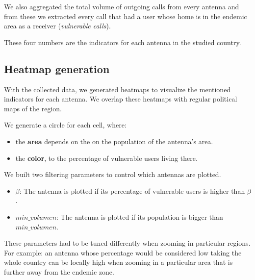     We also aggregated the total volume of outgoing calls from every antenna and from these we extracted every call that had a user whose home is in the endemic area as a receiver (\textit{vulnerable calls}).
    
    These four numbers are the indicators for each antenna in the studied country.

\subsection{Heatmap generation}
    With the collected data, we generated heatmaps to visualize the mentioned indicators for each antenna. We overlap these heatmaps with regular political maps of the region.
    
	We generate a circle for each cell, where:
	\begin{itemize}
		\item the \textbf{area} depends on the on the population of the antenna's area.
		\item the \textbf{color}, to the percentage of vulnerable users living there.
	\end{itemize}
    
    We built two filtering parameters to control which antennas are plotted.
    \begin{itemize}
        \item $\beta$: The antenna is plotted if its percentage of vulnerable users is higher than $\beta$.
        \item $min\_volumen$: The antenna is plotted if its population is bigger than $min\_volumen$.
    \end{itemize}
    
    These parameters had to be tuned differently when zooming in particular regions. For example: an antenna whose percentage would be considered low taking the whole country can be locally high when zooming in a particular area that is further away from the endemic zone.